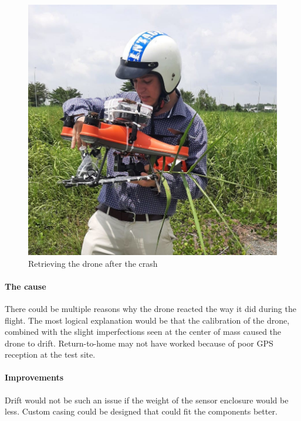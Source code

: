 \begin{figure}[h]
\centering
\includegraphics[scale=1]{080_testing/flights/33_afterflight.jpg}
\caption{Retrieving the drone after the crash}
\end{figure}

\paragraph{The cause}
There could be multiple reasons why the drone reacted the way it did during the flight. The most logical explanation would be that the calibration of the drone, combined with the slight imperfections seen at the center of mass caused the drone to drift. Return-to-home may not have worked because of poor \gls{GPS} reception at the test site.

\paragraph{Improvements}
Drift would not be such an issue if the weight of the sensor enclosure would be less. Custom casing could be designed that could fit the components better.
